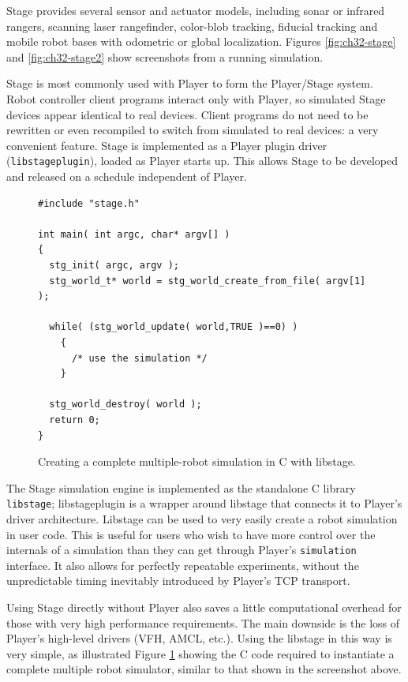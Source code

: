 Stage provides several sensor and actuator models, including sonar or
infrared rangers, scanning laser rangefinder, color-blob tracking,
fiducial tracking and mobile robot bases with odometric or global
localization. Figures \ref{fig:ch32-stage} and \ref{fig:ch32-stage2} show
screenshots from a running simulation.

Stage is most commonly used with Player to form the Player/Stage
system. Robot controller client programs interact only with Player, so
simulated Stage devices appear identical to real devices. Client
programs do not need to be rewritten or even recompiled to switch from
simulated to real devices: a very convenient feature. Stage is
implemented as a Player plugin driver ({\tt libstageplugin}), loaded
as Player starts up. This allows Stage to be developed and released on
a schedule independent of Player.


\begin{figure}
\begin{center}
\begin{verbatim}
#include "stage.h"

int main( int argc, char* argv[] )
{ 
  stg_init( argc, argv );
  stg_world_t* world = stg_world_create_from_file( argv[1] );
  
  while( (stg_world_update( world,TRUE )==0) )
    {
      /* use the simulation */
    }
 
  stg_world_destroy( world );
  return 0;
}
\end{verbatim}
\caption{\label{fig:ch32-libstage}Creating a complete multiple-robot simulation in C with libstage.}
\end{center}
\end{figure}


The Stage simulation engine is implemented as the standalone C library
{\tt libstage}; libstageplugin is a wrapper around libstage that
connects it to Player's driver architecture. Libstage can be used to
very easily create a robot simulation in user code. This is useful for
users who wish to have more control over the internals of a simulation
than they can get through Player's {\tt simulation} interface. It also
allows for perfectly repeatable experiments, without the unpredictable
timing inevitably introduced by Player's TCP transport. 

Using Stage directly without Player also saves a little computational
overhead for those with very high performance requirements. The main
downside is the loss of Player's high-level drivers (VFH, AMCL,
etc.). Using the libstage in this way is very simple, as illustrated
Figure
\ref{fig:ch32-libstage} showing the C code required to instantiate a
complete multiple robot simulator, similar to that shown in the
screenshot above.

